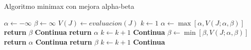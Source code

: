 \documentclass[runningheads]{llncs}
\begin{document}
\begin{algorithm}[H]
\caption{Algoritmo minimax con mejora alpha-beta}\label{alg:2}
\begin{algorithmic}
\State $\alpha \gets -\infty$
\State $\beta \gets \infty$
    \State $V(J) \gets evaluacion(J)$
\State $k \gets 1$
        \State $\alpha \gets  \max [\alpha, V(J;\alpha,\beta)]$
        \If{$\alpha \geq \beta$}
            \State \textbf{return} $ \beta$
        \Else
            \State \textbf{Continua}
        \EndIf
            \State \textbf{return} $\alpha$
        \Else
            \State $k \gets k+1$
            \State \textbf{Continua}
        \EndIf
    \EndIf
        \State $\beta \gets \min[\beta,V(J;\alpha,\beta)]$
        \If{$\beta \leq \alpha$}
            \State \textbf{return} $\alpha$
        \Else
            \State \textbf{Continua}
        \EndIf
            \State \textbf{return} $\beta$
        \Else
            \State $k \gets k+1$
            \State \textbf{Continua}
        \EndIf
    \EndIf
\EndIf 
\end{algorithmic}
\end{algorithm}
\end{document}
